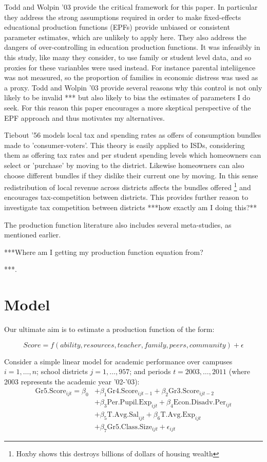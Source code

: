 \documentclass[11pt]{article}
\begin{document}
Todd and Wolpin '03 provide the critical framework for this paper. In particular they address the strong assumptions required in order to make fixed-effects educational production functions (EPFs) provide unbiased or consistent parameter estimates, which are unlikely to apply here. They also address the dangers of over-controlling in education production functions. It was infeasibly in this study, like many they consider, to use family or student level data, and so proxies for these varianbles were used instead. For instance parental inteliigence was not measured, so the proportion of families in economic distress was used as a proxy. Todd and Wolpin '03 provide several reasons why this control is not only likely to be invalid *** but also likely to bias the estimates of parameters I do seek. For this reason this paper encourages a more skeptical perspective of the EPF approach and thus motivates my alternatives. 

Tiebout '56 models local tax and spending rates as offers of consumption bundles made to 'consumer-voters'. This theory is easily applied to ISDs, considering them as offering tax rates and per student spending levels which homeowners can select or 'purchase' by moving to the district. Likewise homeowners can also choose different bundles if they dislike their current one by moving. In this sense redistribution of local revenue across districts affects the bundles offered \footnote{Hoxby shows this destroys billions of dollars of housing wealth} and encourages tax-competition between districts. This provides further reason to investigate tax competition between districts ***how exactly am I doing this?**

The production function literature also includes several meta-studies, as mentioned earlier. 


***Where am I getting my production function equation from?


***.




\section{Model}
\label{s:next}

Our ultimate aim is to estimate a production function of the form:

$$Score = f(ability,resources,teacher,family,peers,community) + \epsilon$$

Consider a simple linear model for academic performance over campuses $i=1,\ldots,n$; school districts $j=1,\ldots,957$; and periods $t=2003,\ldots,2011$ (where 2003 represents the academic year '02-'03):
\begin{align*}
\mathrm{Gr5.Score}_{ijt} = \beta_{0} 
    &+ \beta_{1}  \mathrm{Gr4.Score}_{ijt-1} 
    + \beta_{2}  \mathrm{Gr3.Score}_{ijt-2}    \\
    &+ \beta_{3}  \mathrm{Per.Pupil.Exp}_{ijt} 
    + \beta_{4}  \mathrm{Econ.Disadv.Per}_{ijt} \\
    &+ \beta_{5}  \mathrm{T.Avg.Sal}_{ijt}   
    + \beta_{6}  \mathrm{T.Avg.Exp}_{ijt}  \\
    &+ \beta_{7}  \mathrm{Gr5.Class.Size}_{ijt} + \epsilon_{ijt}
\end{align*}
\end{document}
